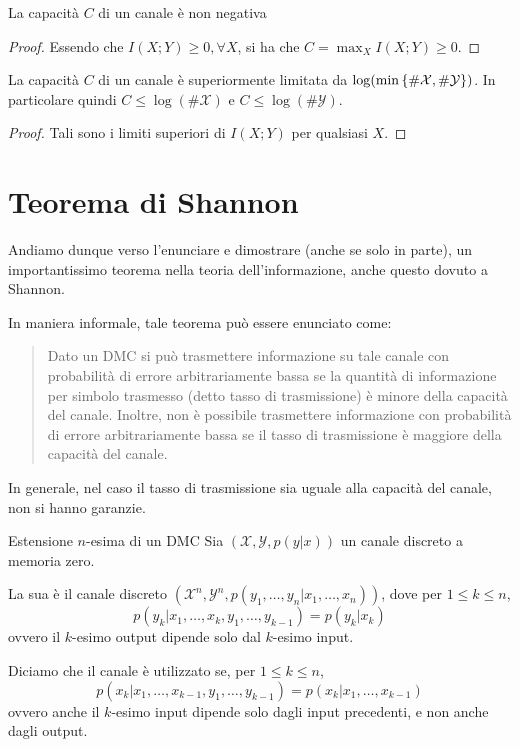 \begin{proposition}{}
  La capacità \(C\) di un canale è non negativa
\end{proposition}
\begin{proof}
  Essendo che \(I(X;Y) \geq 0, \forall X\), si ha che \(C = \max_X I(X;Y) \geq 0\).
\end{proof}

\begin{proposition}{}
  La capacità \(C\) di un canale è superiormente limitata da \(\log(\min\set{\#\mathcal{X}, \#\mathcal{Y}})\).
  In particolare quindi \(C\leq\log(\#\mathcal{X})\) e \(C\leq\log(\#\mathcal{Y})\).
\end{proposition}
\begin{proof}
  Tali sono i limiti superiori di \(I(X;Y)\) per qualsiasi \(X\).
\end{proof}

\section{Teorema di Shannon}

Andiamo dunque verso l'enunciare e dimostrare (anche se solo in parte), un importantissimo teorema nella teoria dell'informazione, anche questo dovuto a Shannon.

In maniera informale, tale teorema può essere enunciato come:

\begin{quote}
  Dato un DMC si può trasmettere informazione su tale canale con probabilità di errore arbitrariamente bassa se la quantità di informazione per simbolo trasmesso (detto tasso di trasmissione) è minore della capacità del canale.
  Inoltre, non è possibile trasmettere informazione con probabilità di errore arbitrariamente bassa se il tasso di trasmissione è maggiore della capacità del canale.
\end{quote}

\begin{note}{}
  In generale, nel caso il tasso di trasmissione sia uguale alla capacità del canale, non si hanno garanzie.
\end{note}

\begin{definition}{Estensione \(n\)-esima di un DMC}
  Sia \((\mathcal{X}, \mathcal{Y}, p(y|x))\) un canale discreto a memoria zero.

  La sua  è il canale discreto \((\mathcal{X}^n, \mathcal{Y}^n, p(y_1,\ldots,y_n|x_1,\ldots,x_n))\), dove per \(1\leq k\leq n\),
  \[p(y_k|x_1, \ldots,x_k,y_1,\ldots,y_{k-1}) = p(y_k|x_k)\]
  ovvero il \(k\)-esimo output dipende solo dal \(k\)-esimo input.
  
  Diciamo che il canale è utilizzato  se, per \(1\leq k \leq n\),
  \[p(x_k|x_1,\ldots,x_{k-1},y_1,\ldots,y_{k-1}) = p(x_k|x_1,\ldots,x_{k-1})\]
  ovvero anche il \(k\)-esimo input dipende solo dagli input precedenti, e non anche dagli output.
\end{definition}

